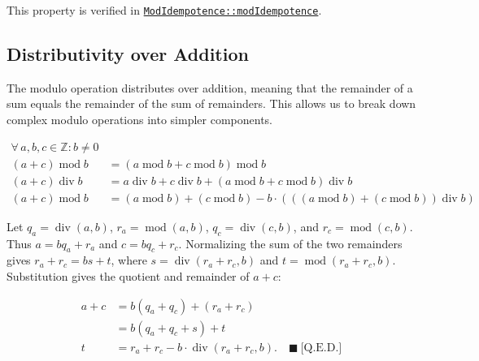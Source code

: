 This property is verified in
\href{https://github.com/thiagomata/prime-numbers/blob/modulo-article-v1.0.0/src/main/scala/v1/chapter2/div/properties/ModIdempotence.scala#modIdempotence}{\texttt{ModIdempotence::modIdempotence}}.

\subsection{Distributivity over Addition}
\label{sec:distributivity-addition}

The modulo operation distributes over addition, meaning that the remainder
of a sum equals the remainder of the sum of remainders. This allows us to
break down complex modulo operations into simpler components.

\begin{equation*}
\begin{aligned}
\forall\, a, b, c \in \mathbb{Z} : b \neq 0 \\
( a + c ) \operatorname{mod} b
  &= ( a \operatorname{mod} b + c \operatorname{mod} b )
     \operatorname{mod} b \\
( a + c ) \operatorname{div} b
  &= a \operatorname{div} b + c \operatorname{div} b
     + ( a \operatorname{mod} b + c \operatorname{mod} b )
       \operatorname{div} b \\
( a + c) \operatorname{mod} b
  &= (a \operatorname{mod} b) + (c \operatorname{mod} b)
     - b \cdot (((a \operatorname{mod} b)
     + (c \operatorname{mod} b)) \operatorname{div} b)
\end{aligned}
\end{equation*}

Let $q_a=\operatorname{div}(a,b)$, $r_a=\operatorname{mod}(a,b)$,
$q_c=\operatorname{div}(c,b)$, and $r_c=\operatorname{mod}(c,b)$. Thus
$a=bq_a+r_a$ and $c=bq_c+r_c$. Normalizing the sum of the two remainders
gives $r_a+r_c=bs+t$, where $s=\operatorname{div}(r_a+r_c,b)$ and
$t=\operatorname{mod}(r_a+r_c,b)$. Substitution gives the quotient and
remainder of $a+c$:

\begin{equation*}
\begin{aligned}
a+c &= b(q_a+q_c)+(r_a+r_c) \\
    &= b(q_a+q_c+s)+t \\
t &= r_a+r_c-b\cdot\operatorname{div}(r_a+r_c,b).
  \quad \blacksquare\ \text{[Q.E.D.]}
\end{aligned}
\end{equation*}

